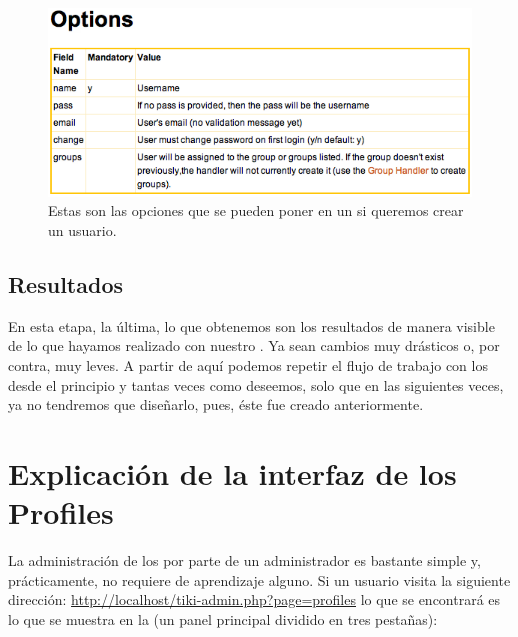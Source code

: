 \begin{figure}
\centering
\includegraphics[width=\linewidth]{../graphics/fig_ejemplo_opciones_handler_usuario.png}
\caption{Estas son las opciones que se pueden poner en un \profile{} si queremos crear un usuario.}\label{fig:ejemplo_opciones_handler_usuario}
\end{figure}

\subsection{Resultados}

En esta etapa, la última, lo que obtenemos son los resultados de manera visible de lo que hayamos realizado con nuestro \profile{}. Ya sean cambios muy drásticos o, por contra, muy leves. A partir de aquí podemos repetir el flujo de trabajo con los \profiles{} desde el principio y tantas veces como deseemos, solo que en las siguientes veces, ya no tendremos que diseñarlo, pues, éste fue creado anteriormente.

\section{Explicación de la interfaz de los Profiles}

La administración de los \profiles{} por parte de un administrador es bastante simple y, prácticamente, no requiere de aprendizaje alguno. Si un usuario visita la siguiente dirección: \url{http://localhost/tiki-admin.php?page=profiles} lo que se encontrará es lo que se muestra en la  (un panel principal dividido en tres pestañas):

